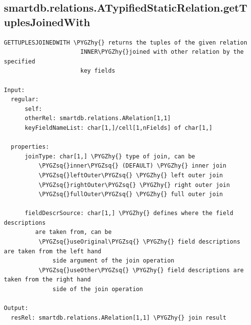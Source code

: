 \documentclass[letterpaper,10pt,english]{sphinxmanual}
\def\PYGZhy{\char`\-}
\def\PYGZsq{\char`\'}
\begin{document}
\subsection{smartdb.relations.ATypifiedStaticRelation.getTuplesJoinedWith}
\label{chap_functions:smartdb-relations-atypifiedstaticrelation-gettuplesjoinedwith}
\begin{Verbatim}[commandchars=\\\{\}]
GETTUPLESJOINEDWITH \PYGZhy{} returns the tuples of the given relation
                      INNER\PYGZhy{}joined with other relation by the specified
                      key fields

Input:
  regular:
      self:
      otherRel: smartdb.relations.ARelation[1,1]
      keyFieldNameList: char[1,]/cell[1,nFields] of char[1,]

  properties:
      joinType: char[1,] \PYGZhy{} type of join, can be
          \PYGZsq{}inner\PYGZsq{} (DEFAULT) \PYGZhy{} inner join
          \PYGZsq{}leftOuter\PYGZsq{} \PYGZhy{} left outer join
          \PYGZsq{}rightOuter\PYGZsq{} \PYGZhy{} right outer join
          \PYGZsq{}fullOuter\PYGZsq{} \PYGZhy{} full outer join

      fieldDescrSource: char[1,] \PYGZhy{} defines where the field descriptions
         are taken from, can be
          \PYGZsq{}useOriginal\PYGZsq{} \PYGZhy{} field descriptions are taken from the left hand
              side argument of the join operation
          \PYGZsq{}useOther\PYGZsq{} \PYGZhy{} field descriptions are taken from the right hand
              side of the join operation

Output:
  resRel: smartdb.relations.ARelation[1,1] \PYGZhy{} join result
\end{Verbatim}
\end{document}
